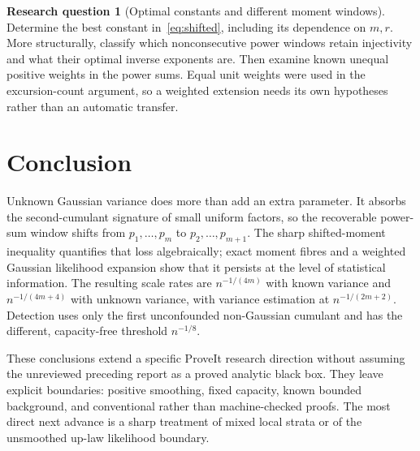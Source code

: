 \documentclass[11pt,a4paper]{article}
\numberwithin{equation}{section}
\theoremstyle{definition}
\newtheorem{problem}{Research question}
\theoremstyle{remark}
\begin{document}
\begin{problem}[Optimal constants and different moment windows]
Determine the best constant in~\eqref{eq:shifted}, including its dependence
on $m,r$. More structurally, classify which nonconsecutive power windows
retain injectivity and what their optimal inverse exponents are. Then examine
known unequal positive weights in the power sums. Equal unit weights were
used in the excursion-count argument, so a weighted extension needs its own
hypotheses rather than an automatic transfer.
\end{problem}

\section{Conclusion}
Unknown Gaussian variance does more than add an extra parameter. It absorbs
the second-cumulant signature of small uniform factors, so the recoverable
power-sum window shifts from $p_1,\ldots,p_m$ to $p_2,\ldots,p_{m+1}$.
The sharp shifted-moment inequality quantifies that loss algebraically;
exact moment fibres and a weighted Gaussian likelihood expansion show that
it persists at the level of statistical information. The resulting scale
rates are $n^{-1/(4m)}$ with known variance and $n^{-1/(4m+4)}$ with unknown
variance, with variance estimation at $n^{-1/(2m+2)}$. Detection uses only the
first unconfounded non-Gaussian cumulant and has the different, capacity-free
threshold $n^{-1/8}$.

These conclusions extend a specific ProveIt research direction without
assuming the unreviewed preceding report as a proved analytic black box.
They leave explicit boundaries: positive smoothing, fixed capacity, known
bounded background, and conventional rather than machine-checked proofs.
The most direct next advance is a sharp treatment of mixed local strata or
of the unsmoothed up-law likelihood boundary.
\end{document}
